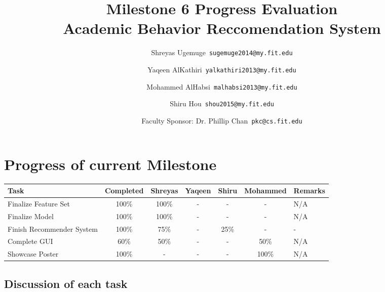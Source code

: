 \documentclass[12pt]{article}
\begin{document}
	\title{\textbf{Milestone 6 Progress Evaluation} \\ \hfill \break
	Academic Behavior Reccomendation System}
	\author{Shreyas Ugemuge\      \texttt{sugemuge2014@my.fit.edu}
  \and
  Yaqeen AlKathiri\      \texttt{yalkathiri2013@my.fit.edu}
  \and
	Mohammed AlHabsi\      \texttt{malhabsi2013@my.fit.edu}
  \and
  Shiru Hou\      \texttt{shou2015@my.fit.edu}
  \and
  Faculty Sponsor: Dr. Phillip Chan\      \texttt{pkc@cs.fit.edu}}
	\maketitle
	\pagebreak
	\singlespacing
	\tableofcontents
	\pagebreak
	\section{Progress of current Milestone}
	\begin{tabularx}{\textwidth}{|X|c|c|c|c|c|X|}
	\hline
		\textbf{Task} & \textbf{Completed} &\textbf{Shreyas} & \textbf{Yaqeen} & \textbf{Shiru} & \textbf{Mohammed} & \textbf{Remarks}  \\ \hline
			Finalize Feature Set &100\% & 100\% & - & - & - & N/A \\ \hline
			Finalize Model & 100\% & 100\% & - & - & - & N/A \\ \hline
			Finish Recommender System & 100\% & 75\% & - & 25\% & - & - \\ \hline
			Complete GUI & 60\% & 50\% & - & - & 50\% & N/A \\ \hline
			Showcase Poster & 100\% & - & - & - & 100\% & N/A \\ \hline
		
	\end{tabularx}
	\subsection{Discussion of each task}
\end{document}
